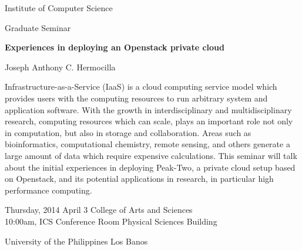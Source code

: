 \documentclass[12pt]{article}
\begin{document}
\baselineskip 24pt

\parindent 0.0cm


\begin{center}

{\rm \Huge{Institute of Computer Science}}

\bigskip

{\rm \Large Graduate Seminar}

\end{center}

\smallskip

\hspace*{-1cm}
\framebox[16.5cm]{\rule[-.5cm]{0cm}{15cm} }

\vspace*{ -15cm}

\begin{center}
{\rm \Huge

\textbf{Experiences in deploying an Openstack private cloud}

\bigskip
\bigskip
Joseph Anthony C. Hermocilla 
}

\end{center}

\vfill

\baselineskip 15pt
\Large{
Infrastructure-as-a-Service (IaaS) is a cloud computing service model which provides users with the computing resources to run arbitrary system and application software. With the growth in interdisciplinary and multidisciplinary research, computing resources which can scale, plays an important role not only in computation, but also in storage and collaboration. Areas such as bioinformatics, computational chemistry, remote sensing, and others generate a large amount of data which require expensive calculations. This seminar will talk about the initial experiences in deploying Peak-Two, a private cloud setup based on Openstack, and its potential applications in research, in particular high performance computing.
}
\medskip

\baselineskip 12pt



\baselineskip 24pt

\vfill



{\rm \Large 
Thursday, 2014 April 3    \hfill           College of Arts and Sciences\\ 
10:00am, ICS Conference Room   \hfill           Physical Sciences Building\\
\centerline       {University of the Philippines Los Banos}
}
\end{document}

